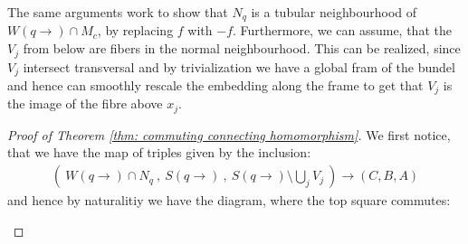 	The same arguments work to show that $N_q$ is a tubular neighbourhood of $W(q\to)\cap M_c$, by replacing $f$ with $-f$. Furthermore, we can assume, that the $V_j$ from below are fibers in the normal neighbourhood. This can be realized, since $V_j$ intersect transversal and by trivialization we have a global fram of the bundel and hence can smoothly rescale the embedding along the frame to get that $V_j$ is the image of the fibre above $x_j$. 
	
	
	
	
	
	
	
	
	
	
	
	\begin{proof}[Proof of Theorem \ref{thm: commuting connecting homomorphism}]
		We first notice, that we have the map of triples given by the inclusion:
		\begin{align*}
			\left( ~W(q\to)\cap N_q ~,~S(q\to)~,~S(q\to ) \setminus \bigcup\limits_jV_j ~\right) \to (C,B,A)
		\end{align*} and hence by naturalitiy we have the diagram, where the top square commutes:
		\begin{fdiagram}
\end{fdiagram}
\end{proof}
